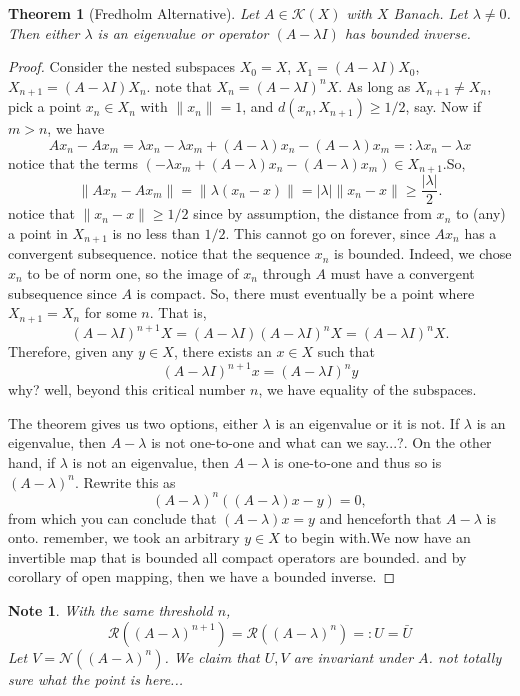 \documentclass[letterpaper,twoside,11pt]{article}
\theoremstyle{mystyle}
\newtheorem{theorem}{Theorem}[section]
\newtheorem*{note}{Note}
\newcommand{\cg}{\color{gray}}
\newcommand{\cbk}{\color{black}}
\begin{document}
\begin{tcolorbox}[colback=red!5!white,colframe=red!75!black]
\begin{theorem}[Fredholm Alternative]
  Let $A \in \mathcal K (X)$ with $X$ Banach. Let $\lambda \neq 0$. Then either $\lambda$ is an eigenvalue or operator $(A-\lambda I)$ has bounded inverse. 
\end{theorem}
\end{tcolorbox}
\begin{proof}
  Consider the nested subspaces $X_0 = X$, $X_1 = (A-\lambda I )X_0$, $X_{n+1} = (A-\lambda I)X_n$. \cg note that $X_n = (A-\lambda I )^nX$. \cbk As long as $X_{n+1} \neq X_n$, pick a point $x_n \in X_n$ with $\|x_n\|=1$, and $d(x_n, X_{n+1})\geq 1/2$, say. Now if $m>n$, we have 
  \[Ax_n - Ax_m = \lambda x_n - \lambda x_m + (A-\lambda) x_n - (A-\lambda) x_m =: \lambda x_n - \lambda x\] \cg notice that the terms $(- \lambda x_m + (A-\lambda) x_n - (A-\lambda) x_m)\in X_{n+1}$.\cbk So, 
  \[\|Ax_n - Ax_m\| = \|\lambda (x_n - x)\| = |\lambda| \|x_n - x\|\geq \frac{|\lambda|}{2}.\]\cg notice that $\|x_n -x\|\geq 1/2$ since by assumption, the distance from $x_n$ to (any) a point in $X_{n+1}$ is no less than $1/2$. \cbk This cannot go on forever, since $Ax_n$ has a convergent subsequence. \cg notice that the sequence $x_n$ is bounded. Indeed, we chose $x_n$ to be of norm one, so the image of $x_n$ through $A$ must have a convergent subsequence since $A$ is compact. \cbk So, there must eventually be a point where $X_{n+1} = X_n$ for some $n$. That is, \[(A-\lambda I )^{n+1} X =(A-\lambda I )(A-\lambda I )^{n} X=(A-\lambda I )^{n} X.  \]
  Therefore, given any $y\in X$, there exists an $x\in X$ such that 
  \[(A-\lambda I )^{n+1} x = (A-\lambda I )^{n}y\]\cg why? well, beyond this critical number $n$, we have equality of the subspaces.\cbk 

  The theorem gives us two options, either $\lambda$ is an eigenvalue or it is not. If $\lambda$ is an eigenvalue, then $A-\lambda$ is not one-to-one and \cg what can we say...?\cbk. On the other hand, if $\lambda$ is not an eigenvalue, then $A-\lambda$ is one-to-one and thus so is $(A-\lambda)^n$. Rewrite this as 
  \[(A-\lambda)^n((A-\lambda)x-y)=0,\] from which you can conclude that $(A-\lambda)x = y$ and henceforth that $A-\lambda$ is onto. \cg remember, we took an arbitrary $y\in X$ to begin with.\cbk We now have an invertible map that is bounded \cg all compact operators are bounded. \cbk and by corollary of open mapping, then we have a bounded inverse. 
\end{proof}
\begin{note}
  With the same threshold $n$, 
  \[\mathcal R((A-\lambda)^{n+1}) = \mathcal R ((A-\lambda)^n) =: U = \bar U\]
  Let $V = \mathcal N ((A-\lambda)^n)$. We claim that $U,V$ are invariant under $A$. \cg not totally sure what the point is here...\cbk  
\end{note}
\end{document}
